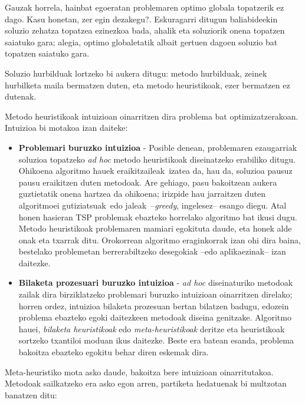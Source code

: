\documentclass[eu]{ifirak}\usepackage[]{graphicx}\usepackage[]{color}
\newcommand{\zkk}{\guillemotleft}
\newcommand{\skk}{\guillemotright}
\begin{document}
Gauzak horrela, hainbat egoeratan problemaren optimo globala topatzerik ez dago. Kasu honetan, zer egin dezakegu?. Eskuragarri ditugun baliabideekin soluzio zehatza topatzea ezinezkoa bada, ahalik eta soluziorik onena topatzen saiatuko gara; alegia, optimo globaletatik albait gertuen dagoen soluzio bat topatzen saiatuko gara. 

Soluzio hurbilduak lortzeko bi aukera ditugu: metodo hurbilduak, zeinek hurbilketa maila bermatzen duten, eta metodo heuristikoak, ezer bermatzen ez dutenak. 

Metodo heuristikoak intuizioan oinarritzen dira problema bat optimizatzerakoan. Intuizioa bi motakoa izan daiteke:

\begin{itemize}
\item \textbf{Problemari buruzko intuizioa} - Posible denean, problemaren ezaugarriak soluzioa topatzeko \textit{ad hoc} metodo heuristikoak diseinatzeko erabiliko ditugu. Ohikoena algoritmo hauek \zkk eraikitzaileak\skk\ izatea da, hau da, soluzioa pausuz pausu eraikitzen duten metodoak. Are gehiago, pasu bakoitzean aukera guztietatik onena hartzea da ohikoena; irizpide hau jarraitzen duten algoritmoei \zkk gutiziatsuak\skk\ edo \zkk jaleak\skk\ --\textit{greedy}, ingelesez-- esango diegu.
Atal honen hasieran TSP problemak ebazteko horrelako algoritmo bat ikusi dugu. Metodo heuristikoak problemaren mamiari egokituta daude, eta honek alde onak eta txarrak ditu. Orokorrean algoritmo eraginkorrak izan ohi dira baina, bestelako problemetan berrerabiltzeko desegokiak --edo aplikaezinak-- izan daitezke.
\item \textbf{Bilaketa prozesuari buruzko intuizioa} - \textit{ad hoc} diseinaturiko metodoak zailak dira birziklatzeko problemari buruzko intuizioan oinarritzen direlako; horren ordez, intuizioa bilaketa prozesuan bertan bilatzen badugu, edozein problema ebazteko egoki daitezkeen metodoak diseina genitzake. Algoritmo hauei, \textit{bilaketa heuristikoak} edo \textit{meta-heuristikoak} deritze eta heuristikoak sortzeko txantiloi moduan ikus daitezke. Beste era batean esanda, problema bakoitza ebazteko egokitu behar diren eskemak dira.
\end{itemize}

Meta-heuristiko mota asko daude, bakoitza bere intuizioan oinarritutakoa. Metodoak sailkatzeko era asko egon arren, partiketa hedatuenak bi multzotan banatzen ditu:
\end{document}
